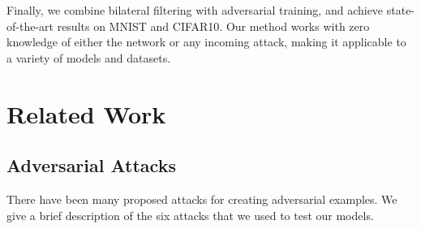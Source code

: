 \documentclass{article} %
\begin{document}
Finally, we combine bilateral filtering with adversarial training, and achieve state-of-the-art results on MNIST and CIFAR10. Our method works with zero knowledge of either the network or any incoming attack, making it applicable to a variety of models and datasets. %

\section{Related Work}
\subsection{Adversarial Attacks}
There have been many proposed attacks for creating adversarial examples. We give a brief description of the six attacks that we used to test our models. \\
\end{document}
